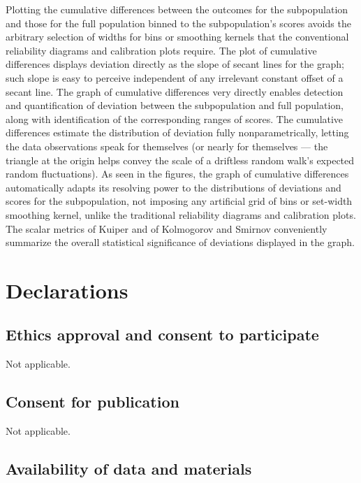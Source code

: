 \documentclass{article}
\begin{document}
Plotting the cumulative differences between the outcomes for the subpopulation
and those for the full population binned to the subpopulation's scores
avoids the arbitrary selection of widths for bins or smoothing kernels
that the conventional reliability diagrams and calibration plots require.
The plot of cumulative differences displays deviation directly as the slope
of secant lines for the graph; such slope is easy to perceive independent
of any irrelevant constant offset of a secant line.
The graph of cumulative differences very directly enables detection
and quantification of deviation between the subpopulation and full population,
along with identification of the corresponding ranges of scores.
The cumulative differences estimate the distribution of deviation
fully nonparametrically, letting the data observations speak for themselves
(or nearly for themselves --- the triangle at the origin helps convey the scale
of a driftless random walk's expected random fluctuations).
As seen in the figures, the graph of cumulative differences automatically
adapts its resolving power to the distributions of deviations and scores
for the subpopulation, not imposing any artificial grid of bins
or set-width smoothing kernel, unlike the traditional reliability diagrams
and calibration plots.
The scalar metrics of Kuiper and of Kolmogorov and Smirnov
conveniently summarize the overall statistical significance of deviations
displayed in the graph.



\section*{Declarations}


\subsection*{Ethics approval and consent to participate}

Not applicable.


\subsection*{Consent for publication}

Not applicable.


\subsection*{Availability of data and materials}
\end{document}
